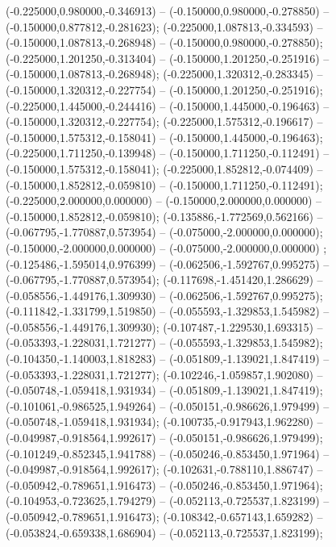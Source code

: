  (-0.225000,0.980000,-0.346913) -- (-0.150000,0.980000,-0.278850) -- (-0.150000,0.877812,-0.281623);
 (-0.225000,1.087813,-0.334593) -- (-0.150000,1.087813,-0.268948) -- (-0.150000,0.980000,-0.278850);
 (-0.225000,1.201250,-0.313404) -- (-0.150000,1.201250,-0.251916) -- (-0.150000,1.087813,-0.268948);
 (-0.225000,1.320312,-0.283345) -- (-0.150000,1.320312,-0.227754) -- (-0.150000,1.201250,-0.251916);
 (-0.225000,1.445000,-0.244416) -- (-0.150000,1.445000,-0.196463) -- (-0.150000,1.320312,-0.227754);
 (-0.225000,1.575312,-0.196617) -- (-0.150000,1.575312,-0.158041) -- (-0.150000,1.445000,-0.196463);
 (-0.225000,1.711250,-0.139948) -- (-0.150000,1.711250,-0.112491) -- (-0.150000,1.575312,-0.158041);
 (-0.225000,1.852812,-0.074409) -- (-0.150000,1.852812,-0.059810) -- (-0.150000,1.711250,-0.112491);
 (-0.225000,2.000000,0.000000) -- (-0.150000,2.000000,0.000000) -- (-0.150000,1.852812,-0.059810);
 (-0.135886,-1.772569,0.562166) -- (-0.067795,-1.770887,0.573954) -- (-0.075000,-2.000000,0.000000);
 (-0.150000,-2.000000,0.000000) -- (-0.075000,-2.000000,0.000000) ;
 (-0.125486,-1.595014,0.976399) -- (-0.062506,-1.592767,0.995275) -- (-0.067795,-1.770887,0.573954);
 (-0.117698,-1.451420,1.286629) -- (-0.058556,-1.449176,1.309930) -- (-0.062506,-1.592767,0.995275);
 (-0.111842,-1.331799,1.519850) -- (-0.055593,-1.329853,1.545982) -- (-0.058556,-1.449176,1.309930);
 (-0.107487,-1.229530,1.693315) -- (-0.053393,-1.228031,1.721277) -- (-0.055593,-1.329853,1.545982);
 (-0.104350,-1.140003,1.818283) -- (-0.051809,-1.139021,1.847419) -- (-0.053393,-1.228031,1.721277);
 (-0.102246,-1.059857,1.902080) -- (-0.050748,-1.059418,1.931934) -- (-0.051809,-1.139021,1.847419);
 (-0.101061,-0.986525,1.949264) -- (-0.050151,-0.986626,1.979499) -- (-0.050748,-1.059418,1.931934);
 (-0.100735,-0.917943,1.962280) -- (-0.049987,-0.918564,1.992617) -- (-0.050151,-0.986626,1.979499);
 (-0.101249,-0.852345,1.941788) -- (-0.050246,-0.853450,1.971964) -- (-0.049987,-0.918564,1.992617);
 (-0.102631,-0.788110,1.886747) -- (-0.050942,-0.789651,1.916473) -- (-0.050246,-0.853450,1.971964);
 (-0.104953,-0.723625,1.794279) -- (-0.052113,-0.725537,1.823199) -- (-0.050942,-0.789651,1.916473);
 (-0.108342,-0.657143,1.659282) -- (-0.053824,-0.659338,1.686904) -- (-0.052113,-0.725537,1.823199);
